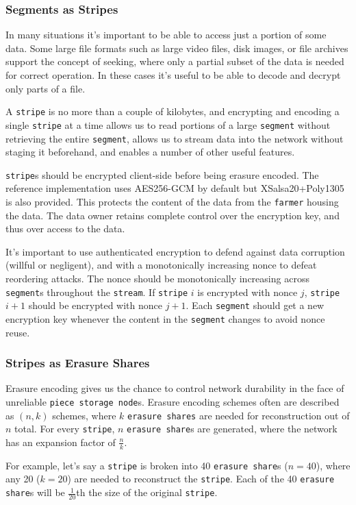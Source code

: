 \documentclass[a4paper,10pt]{article}
\newcommand{\x}[1]{{\tt #1}}
\begin{document}
\subsubsection{Segments as Stripes}

In many situations it's important to be able to access just a portion of some
data. Some large file formats such as large video files, disk images, or file
archives support the concept of seeking, where only a partial subset of the
data is needed for correct operation. In these cases it's useful to be able to
decode and decrypt only parts of a file.

A \x{stripe} is no more than a couple of kilobytes, and encrypting and encoding
a single \x{stripe} at a time allows us to read portions of a large \x{segment}
without retrieving the entire \x{segment}, allows us to stream data into the
network without staging it beforehand, and enables a number of other useful
features.

\x{stripe}s should be encrypted client-side before being erasure encoded. The
reference implementation uses AES256-GCM by default but XSalsa20+Poly1305 is
also provided. This protects the content of the data from the \x{farmer} housing
the data. The data owner retains complete control over the encryption key, and
thus over access to the data.

It's important to use authenticated encryption to defend against data
corruption (willful or negligent), and with a monotonically increasing
nonce to defeat reordering attacks. The nonce should be monotonically increasing
across \x{segment}s throughout the \x{stream}. If \x{stripe} $i$ is encrypted
with nonce $j$, \x{stripe} $i+1$ should be encrypted with nonce $j+1$. Each
\x{segment} should get a new encryption key whenever the content in the
\x{segment} changes to avoid nonce reuse.

\subsubsection{Stripes as Erasure Shares}

Erasure encoding gives us the chance to control network durability in the face
of unreliable \x{piece storage node}s. Erasure encoding schemes often are
described as $(n, k)$ schemes, where $k$ \x{erasure shares} are needed for
reconstruction out of $n$ total. For every \x{stripe}, $n$ \x{erasure share}s
are generated, where the network has an expansion factor of $\frac{n}{k}$.

For example, let's say a \x{stripe} is broken into 40 \x{erasure share}s
($n=40$), where any 20 ($k=20$) are needed to reconstruct the \x{stripe}. Each
of the 40 \x{erasure share}s will be $\frac{1}{20}$th the size of the original
\x{stripe}.
\end{document}
